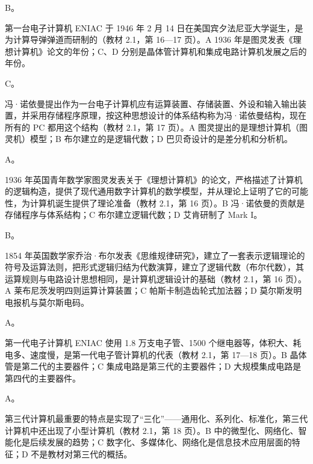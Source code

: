 \documentclass[a4paper,11pt]{article}
\begin{document}


\q B。\begin{analysis}第一台电子计算机 ENIAC 于 1946 年 2 月 14 日在美国宾夕法尼亚大学诞生，是为计算导弹弹道而研制的（教材 2.1，第 16—17 页）。A 1936 年是图灵发表《理想计算机》论文的年份；C、D 分别是晶体管计算机和集成电路计算机发展之后的年份。\end{analysis}

\q C。\begin{analysis}冯·诺依曼提出作为一台电子计算机应有运算装置、存储装置、外设和输入输出装置，并采用存储程序原理，按这种思想设计的体系结构称为冯·诺依曼结构，现在所有的 PC 都用这个结构（教材 2.1，第 17 页）。A 图灵提出的是理想计算机（图灵机）模型；B 布尔建立的是逻辑代数；D 巴贝奇设计的是差分机和分析机。\end{analysis}

\q A。\begin{analysis}1936 年英国青年数学家图灵发表关于《理想计算机》的论文，严格描述了计算机的逻辑构造，提供了现代通用数字计算机的数学模型，并从理论上证明了它的可能性，为计算机诞生提供了理论准备（教材 2.1，第 16 页）。B 冯·诺依曼的贡献是存储程序与体系结构；C 布尔建立逻辑代数；D 艾肯研制了 Mark I。\end{analysis}

\q B。\begin{analysis}1854 年英国数学家乔治·布尔发表《思维规律研究》，建立了一套表示逻辑理论的符号及运算法则，把形式逻辑归结为代数演算，建立了逻辑代数（布尔代数），其运算规则与电路设计思想相同，是计算机逻辑设计的基础（教材 2.1，第 16 页）。A 莱布尼茨发明四则运算计算装置；C 帕斯卡制造齿轮式加法器；D 莫尔斯发明电报机与莫尔斯电码。\end{analysis}

\q A。\begin{analysis}第一代电子计算机 ENIAC 使用 1.8 万支电子管、1500 个继电器等，体积大、耗电多、速度慢，是第一代电子管计算机的代表（教材 2.1，第 17—18 页）。B 晶体管是第二代的主要器件；C 集成电路是第三代的主要器件；D 大规模集成电路是第四代的主要器件。\end{analysis}

\q A。\begin{analysis}第三代计算机最重要的特点是实现了“三化”——通用化、系列化、标准化，第三代计算机中还出现了小型计算机（教材 2.1，第 18 页）。B 中的微型化、网络化、智能化是后续发展的趋势；C 数字化、多媒体化、网络化是信息技术应用层面的特征；D 不是教材对第三代的概括。\end{analysis}
\end{document}
